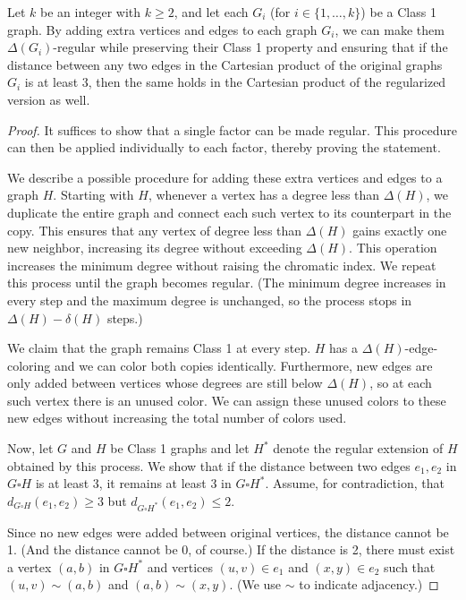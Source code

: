 \documentclass[10pt,a4paper]{amsart}
\begin{document}
\begin{lemma} \label{regularization}
    Let $k$ be an integer with $k \geq 2$, and let each $G_i$ (for $i \in \{1, \dots, k\}$) be a Class 1 graph. By adding extra vertices and edges to each graph $G_i$, we can make them $\Delta(G_i)$-regular while preserving their Class 1 property and ensuring that if the distance between any two edges in the Cartesian product of the original graphs $G_i$ is at least 3, then the same holds in the Cartesian product of the regularized version as well.
\end{lemma}

\begin{proof}
    It suffices to show that a single factor can be made regular. This procedure can then be applied individually to each factor, thereby proving the statement.

    We describe a possible procedure for adding these extra vertices and edges to a graph $H$. Starting with $H$, whenever a vertex has a degree less than $\Delta(H)$, we duplicate the entire graph and connect each such vertex to its counterpart in the copy. This ensures that any vertex of degree less than $\Delta(H)$ gains exactly one new neighbor, increasing its degree without exceeding $\Delta(H)$. This operation increases the minimum degree without raising the chromatic index. We repeat this process until the graph becomes regular. (The minimum degree increases in every step and the maximum degree is unchanged, so the process stops in $\Delta(H)-\delta(H)$ steps.)

    We claim that the graph remains Class 1 at every step. $H$ has a $\Delta(H)$-edge-coloring and we can color both copies identically. Furthermore, new edges are only added between vertices whose degrees are still below $\Delta(H)$, so at each such vertex there is an unused color. We can assign these unused colors to these new edges without increasing the total number of colors used.

    Now, let $G$ and $H$ be Class 1 graphs and let $H^*$ denote the regular extension of $H$ obtained by this process. We show that if the distance between two edges $e_1, e_2$ in $G \square H$ is at least 3, it remains at least 3 in $G \square H^*$. Assume, for contradiction, that $d_{G \square H}(e_1, e_2) \geq 3$ but $d_{G \square H^*}(e_1, e_2) \leq 2$.

    Since no new edges were added between original vertices, the distance cannot be 1. (And the distance cannot be 0, of course.) If the distance is 2, there must exist a vertex $(a, b)$ in $G \square H^*$ and vertices $(u, v) \in e_1$ and $(x, y) \in e_2$ such that $(u, v) \sim (a, b)$ and $(a, b) \sim (x, y)$. (We  use $\sim$ to indicate adjacency.)
    

\end{proof}
\end{document}
